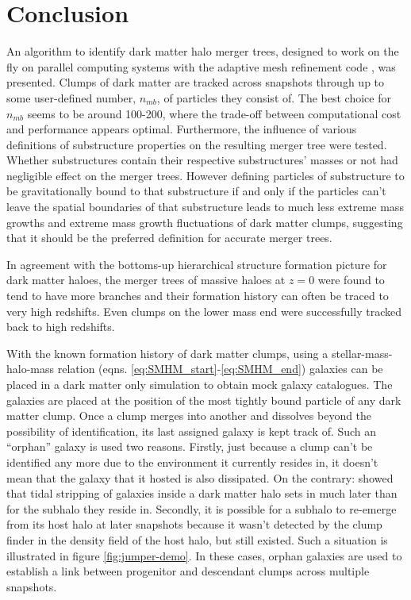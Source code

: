 \section{Conclusion}\label{chap:conclusion}




An algorithm to identify dark matter halo merger trees, designed to work on the fly on parallel computing systems with the adaptive mesh refinement code \ramses, was presented.
Clumps of dark matter are tracked across snapshots through up to some user-defined number, $n_{mb}$, of particles they consist of.
The best choice for $n_{mb}$ seems to be around 100-200, where the trade-off between computational cost and performance appears optimal.
Furthermore, the influence of various definitions of substructure properties on the resulting merger tree were tested.
Whether substructures contain their respective substructures' masses or not had negligible effect on the merger trees.
However defining particles of substructure to be gravitationally bound to that substructure if and only if the particles can't leave the spatial boundaries of that substructure leads to much less extreme mass growths and extreme mass growth fluctuations of dark matter clumps, suggesting that it should be the preferred definition for accurate merger trees.

In agreement with the bottoms-up hierarchical structure formation picture for dark matter haloes, the merger trees of massive haloes at $z=0$ were found to tend to have more branches and their formation history can often be traced to very high redshifts.
Even clumps on the lower mass end were successfully tracked back to high redshifts.


With the known formation history of dark matter clumps, using a stellar-mass-halo-mass relation (eqns. \eqref{eq:SMHM_start}-\eqref{eq:SMHM_end}) galaxies can be placed in a dark matter only simulation to obtain mock galaxy catalogues.
The galaxies are placed at the position of the most tightly bound particle of any dark matter clump.
Once a clump merges into another and dissolves beyond the possibility of identification, its last assigned galaxy is kept track of.
Such an ``orphan'' galaxy is used two reasons.
Firstly, just because a clump can't be identified any more due to the environment it currently resides in, it doesn't mean that the galaxy that it hosted is also dissipated.
On the contrary: \cite{Nagai} showed that tidal stripping of galaxies inside a dark matter halo sets in much later than for the subhalo they reside in.
Secondly, it is possible for a subhalo to re-emerge from its host halo at later snapshots because it wasn't detected by the clump finder in the density field of the host halo, but still existed.
Such a situation is illustrated in figure \ref{fig:jumper-demo}.
In these cases, orphan galaxies are used to establish a link between progenitor and descendant clumps across multiple snapshots.

